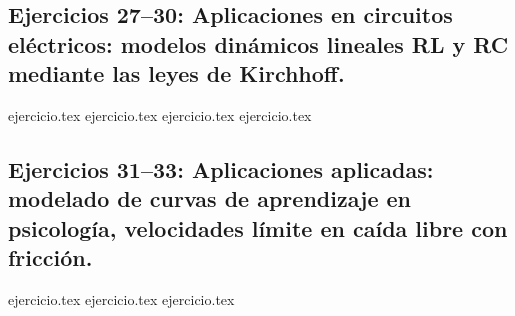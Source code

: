 \subsection*{Ejercicios 27--30: Aplicaciones en circuitos eléctricos: modelos dinámicos lineales RL y RC mediante las leyes de Kirchhoff.}
\begin{enumerate}
    \setcounter{enumi}{26}
    {ejercicio.tex}
    {ejercicio.tex}
    {ejercicio.tex}
    {ejercicio.tex}
\end{enumerate}

\subsection*{Ejercicios 31--33: Aplicaciones aplicadas: modelado de curvas de aprendizaje en psicología, velocidades límite en caída libre con fricción.}
\begin{enumerate}
    \setcounter{enumi}{30}
    {ejercicio.tex}
    {ejercicio.tex}
    {ejercicio.tex}
\end{enumerate}
